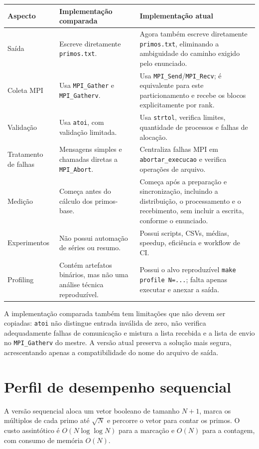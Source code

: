\documentclass[12pt,a4paper]{article}
\begin{document}
\begin{longtable}{p{}p{}p{}}
\toprule
\textbf{Aspecto} & \textbf{Implementação comparada} & \textbf{Implementação atual} \\
\midrule
\endhead
Saída & Escreve diretamente \texttt{primos.txt}. & Agora também escreve diretamente \texttt{primos.txt}, eliminando a ambiguidade do caminho exigido pelo enunciado. \\
Coleta MPI & Usa \texttt{MPI\_Gather} e \texttt{MPI\_Gatherv}. & Usa \texttt{MPI\_Send}/\texttt{MPI\_Recv}; é equivalente para este particionamento e recebe os blocos explicitamente por rank. \\
Validação & Usa \texttt{atoi}, com validação limitada. & Usa \texttt{strtol}, verifica limites, quantidade de processos e falhas de alocação. \\
Tratamento de falhas & Mensagens simples e chamadas diretas a \texttt{MPI\_Abort}. & Centraliza falhas MPI em \texttt{abortar\_execucao} e verifica operações de arquivo. \\
Medição & Começa antes do cálculo dos primos-base. & Começa após a preparação e sincronização, incluindo a distribuição, o processamento e o recebimento, sem incluir a escrita, conforme o enunciado. \\
Experimentos & Não possui automação de séries ou resumo. & Possui scripts, CSVs, médias, speedup, eficiência e workflow de CI. \\
Profiling & Contém artefatos binários, mas não uma análise técnica reproduzível. & Possui o alvo reproduzível \texttt{make profile N=...}; falta apenas executar e anexar a saída. \\
\bottomrule
\end{longtable}

A implementação comparada também tem limitações que não devem ser copiadas:
\texttt{atoi} não distingue entrada inválida de zero, não verifica
adequadamente falhas de comunicação e mistura a lista recebida e a lista de
envio no \texttt{MPI\_Gatherv} do mestre. A versão atual preserva a solução
mais segura, acrescentando apenas a compatibilidade do nome do arquivo de
saída.

\section{Perfil de desempenho sequencial}

A versão sequencial aloca um vetor booleano de tamanho \(N+1\), marca os
múltiplos de cada primo até \(\sqrt{N}\) e percorre o vetor para contar os
primos. O custo assintótico é \(O(N\log\log N)\) para a marcação e \(O(N)\)
para a contagem, com consumo de memória \(O(N)\).
\end{document}
